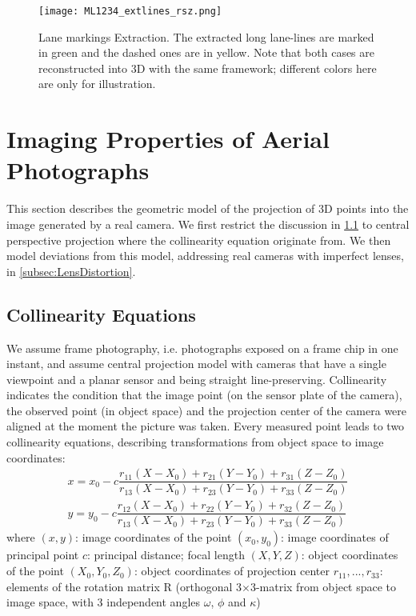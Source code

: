 \begin{figure}
  \centering
  \texttt{[image: ML1234\_extlines\_rsz.png]}
  \caption{\small Lane markings Extraction. The extracted long lane-lines are marked in green and the dashed ones are in yellow.  Note that both cases are reconstructed into 3D with the same framework; different colors here are only for illustration.}
  \label{fig:LineExtraction}
\end{figure}



\section{Imaging Properties of Aerial Photographs}
\label{sec:Geometry}

This section describes the geometric model of the projection of 3D points into the image generated by a real camera. We first restrict the discussion in \cref{subsec:Collinearity} to central perspective projection where the collinearity equation originate from. We then model deviations from this model, addressing real cameras with imperfect lenses, in \cref{subsec:LensDistortion}.

\subsection{Collinearity Equations}
\label{subsec:Collinearity}
We assume frame photography, i.e. photographs exposed on a frame chip in one instant, and assume central projection model with cameras that have a single viewpoint and a planar sensor and being straight line-preserving. Collinearity indicates the condition that the image point (on the sensor plate of the camera), the observed point (in object space) and the projection center of the camera were aligned at the moment the picture was taken. Every measured point leads to two collinearity equations, describing transformations from object space to image coordinates:
\begin{equation} \label{eq:collinearity}
\begin{split}
x = x_0 -c \dfrac {r_{11}(X-X_0) + r_{21}(Y-Y_0) + r_{31}(Z-Z_0)} {r_{13}(X-X_0) + r_{23}(Y-Y_0) + r_{33}(Z-Z_0)} \\
y = y_0 -c \dfrac {r_{12}(X-X_0) + r_{22}(Y-Y_0) + r_{32}(Z-Z_0)} {r_{13}(X-X_0) + r_{23}(Y-Y_0) + r_{33}(Z-Z_0)}
\end{split}
\end{equation}
where\newline
$(x, y)$: image coordinates of the point \newline
$(x_0, y_0)$: image coordinates of principal point \newline
$c$: principal distance; focal length \newline
$(X, Y, Z)$: object coordinates of the point \newline
$(X_0, Y_0, Z_0)$: object coordinates of projection center \newline
$r_{11},...,r_{33}$: elements of the rotation matrix R (orthogonal 3$\times$3-matrix from object space to image space, with 3 independent angles $\omega$, $\phi$ and $\kappa$)

